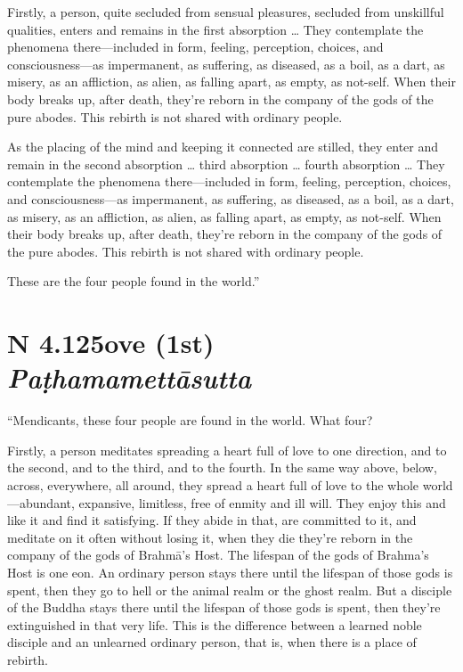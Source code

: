 \documentclass[12pt,openany]{book}%
\newcommand*{\suttatitleacronym}[1]{\smaller[2]{#1}\vspace*{.3em}}
\newcommand*{\suttatitletranslation}[1]{\linebreak{#1}}
\newcommand*{\suttatitleroot}[1]{\linebreak\smaller[2]\itshape{#1}}
\newcommand*{\tocacronym}[1]{\hspace*{-3.3em}{#1}\quad}
\newcommand*{\toctranslation}[1]{#1}
\newcommand*{\tocroot}[1]{(\textit{#1})}
\begin{document}
Firstly, a person, quite secluded from sensual pleasures, secluded from unskillful qualities, enters and remains in the first absorption … They contemplate the phenomena there—included in form, feeling, perception, choices, and consciousness—as impermanent, as suffering, as diseased, as a boil, as a dart, as misery, as an affliction, as alien, as falling apart, as empty, as not-self. When their body breaks up, after death, they’re reborn in the company of the gods of the pure abodes. This rebirth is not shared with ordinary people. 

As the placing of the mind and keeping it connected are stilled, they enter and remain in the second absorption … third absorption … fourth absorption … They contemplate the phenomena there—included in form, feeling, perception, choices, and consciousness—as impermanent, as suffering, as diseased, as a boil, as a dart, as misery, as an affliction, as alien, as falling apart, as empty, as not-self. When their body breaks up, after death, they’re reborn in the company of the gods of the pure abodes. This rebirth is not shared with ordinary people. 

These are the four people found in the world.” 

%
\section*{{\suttatitleacronym AN 4.125}{\suttatitletranslation Love (1st) }{\suttatitleroot Paṭhamamettāsutta}}
\addcontentsline{toc}{section}{\tocacronym{AN 4.125} \toctranslation{Love (1st) } \tocroot{Paṭhamamettāsutta}}

“Mendicants, these four people are found in the world. What four? 

Firstly, a person meditates spreading a heart full of love to one direction, and to the second, and to the third, and to the fourth. In the same way above, below, across, everywhere, all around, they spread a heart full of love to the whole world—abundant, expansive, limitless, free of enmity and ill will. They enjoy this and like it and find it satisfying. If they abide in that, are committed to it, and meditate on it often without losing it, when they die they’re reborn in the company of the gods of \textsanskrit{Brahmā}’s Host. The lifespan of the gods of Brahma’s Host is one eon. An ordinary person stays there until the lifespan of those gods is spent, then they go to hell or the animal realm or the ghost realm. But a disciple of the Buddha stays there until the lifespan of those gods is spent, then they’re extinguished in that very life. This is the difference between a learned noble disciple and an unlearned ordinary person, that is, when there is a place of rebirth. 
\end{document}
